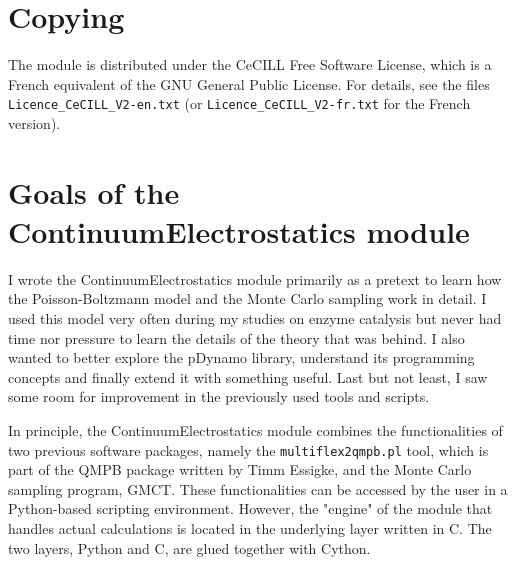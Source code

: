 \documentclass[a4paper,11pt]{article}
\newcommand{\modulename}{ContinuumElectrostatics\xspace}
\begin{document}


\section{Copying}
The module is distributed under the CeCILL Free Software License, which is
a French equivalent of the GNU General Public License.
%
For details, see the files \texttt{Licence\_CeCILL\_V2-en.txt} (or
\texttt{Licence\_CeCILL\_V2-fr.txt} for the French version).


\section{Goals of the \modulename module}
I wrote the \modulename module primarily as a pretext to learn how
the Poisson-Boltzmann model and the Monte Carlo sampling work in detail.
%
I used this model very often during my studies on enzyme catalysis but never had
time nor pressure to learn the details of the theory that was behind.
%
I also wanted to better explore the pDynamo library, understand its programming
concepts and finally extend it with something useful.
%
Last but not least, I saw some room for improvement in the previously used
tools and scripts.

In principle,
the \modulename module combines the functionalities of two previous software packages,
%
namely the \texttt{multiflex2qmpb.pl}
tool, which is part of the QMPB package written by Timm Essigke\cite{Essigke_PhD},
and the Monte Carlo sampling program, GMCT\cite{Ullmann2012,Thomas_PhD}.
%
These functionalities can be accessed by the user 
in a Python-based scripting environment.
%
However,
the "engine" of the module that handles actual calculations is located in 
the underlying layer written in C.
%
The two layers, Python and C, are glued together with Cython.
 
\end{document}
